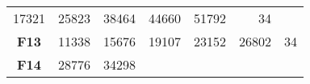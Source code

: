 \documentclass[12pt,a4paper]{article}
\begin{document}
\begin{longtable}[c]{@{}crrrrrr@{}}
\begin{minipage}[t]{0.08\columnwidth}
17321
\strut\end{minipage} &
\begin{minipage}[t]{0.08\columnwidth}\raggedleft\strut
25823
\strut\end{minipage} &
\begin{minipage}[t]{0.09\columnwidth}\raggedleft\strut
38464
\strut\end{minipage} &
\begin{minipage}[t]{0.10\columnwidth}\raggedleft\strut
44660
\strut\end{minipage} &
\begin{minipage}[t]{0.11\columnwidth}\raggedleft\strut
51792
\strut\end{minipage} &
\begin{minipage}[t]{0.07\columnwidth}\raggedleft\strut
34
\strut\end{minipage}\tabularnewline
\begin{minipage}[t]{0.11\columnwidth}\centering\strut
\textbf{F13}
\strut\end{minipage} &
\begin{minipage}[t]{0.08\columnwidth}\raggedleft\strut
11338
\strut\end{minipage} &
\begin{minipage}[t]{0.08\columnwidth}\raggedleft\strut
15676
\strut\end{minipage} &
\begin{minipage}[t]{0.09\columnwidth}\raggedleft\strut
19107
\strut\end{minipage} &
\begin{minipage}[t]{0.10\columnwidth}\raggedleft\strut
23152
\strut\end{minipage} &
\begin{minipage}[t]{0.11\columnwidth}\raggedleft\strut
26802
\strut\end{minipage} &
\begin{minipage}[t]{0.07\columnwidth}\raggedleft\strut
34
\strut\end{minipage}\tabularnewline
\begin{minipage}[t]{0.11\columnwidth}\centering\strut
\textbf{F14}
\strut\end{minipage} &
\begin{minipage}[t]{0.08\columnwidth}\raggedleft\strut
28776
\strut\end{minipage} &
\begin{minipage}[t]{0.08\columnwidth}\raggedleft\strut
34298
\strut\end{minipage} &
\begin{minipage}[t]{0.09\columnwidth}\raggedleft\strut

\end{minipage}
\end{longtable}
\end{document}
